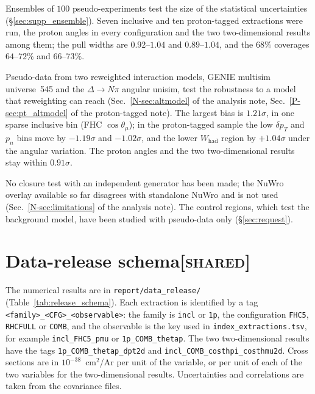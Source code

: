 \documentclass[11pt,a4paper]{article}
\newcommand{\ptref}[2]{#1~\ref{P-#2} of the proton-tagged note}
\newcommand{\noteref}[2]{#1~\ref{N-#2} of the analysis note}
\newcommand{\scopetag}[1]{\hfill{\normalfont\small\textsc{[#1]}}}
\begin{document}
Ensembles of $100$ pseudo-experiments test the size of the statistical uncertainties
(\S\ref{sec:supp_ensemble}). Seven inclusive and ten proton-tagged extractions were run, the proton
angles in every configuration and the two two-dimensional results among them; the pull widths are
$0.92$--$1.04$ and $0.89$--$1.04$, and the $68\%$ coverages $64$--$72\%$ and $66$--$73\%$.

Pseudo-data from two reweighted interaction models, GENIE multisim universe~545 and the
$\Delta\to N\pi$ angular unisim, test the robustness to a model that reweighting can reach
(\noteref{Sec.}{sec:altmodel}, \ptref{Sec.}{sec:pt_altmodel}). The largest bias is $1.21\sigma$, in one
sparse inclusive bin (FHC $\cos\theta_\mu$); in the proton-tagged sample the low $\delta p_T$ and $p_n$
bins move by $-1.19\sigma$ and $-1.02\sigma$, and the lower $W_\mathrm{had}$ region by $+1.04\sigma$ under the angular
variation. The proton angles and the two two-dimensional results stay within $0.91\sigma$.

No closure test with an independent generator has been made; the NuWro overlay available so far
disagrees with standalone NuWro and is not used (\noteref{Sec.}{sec:limitations}). The control regions,
which test the background model, have been studied with pseudo-data only (\S\ref{sec:request}).

\section[Data-release schema]{Data-release schema\scopetag{shared}}
\label{sec:release_schema}

The numerical results are in \texttt{report/data\_release/} (Table~\ref{tab:release_schema}). Each
extraction is identified by a tag \texttt{<family>\_<CFG>\_<observable>}: the family is \texttt{incl}
or \texttt{1p}, the configuration \texttt{FHC5}, \texttt{RHCFULL} or \texttt{COMB}, and the observable
is the key used in \texttt{index\_extractions.tsv}, for example \texttt{incl\_FHC5\_pmu} or
\texttt{1p\_COMB\_thetap}. The two two-dimensional results have the tags
\texttt{1p\_COMB\_thetap\_dpt2d} and \texttt{incl\_COMB\_costhpi\_costhmu2d}. Cross sections are in
$10^{-38}$~cm$^2$/Ar per unit of the variable, or per unit of each of the two variables for the
two-dimensional results. Uncertainties and correlations are taken from the covariance files.
\end{document}
